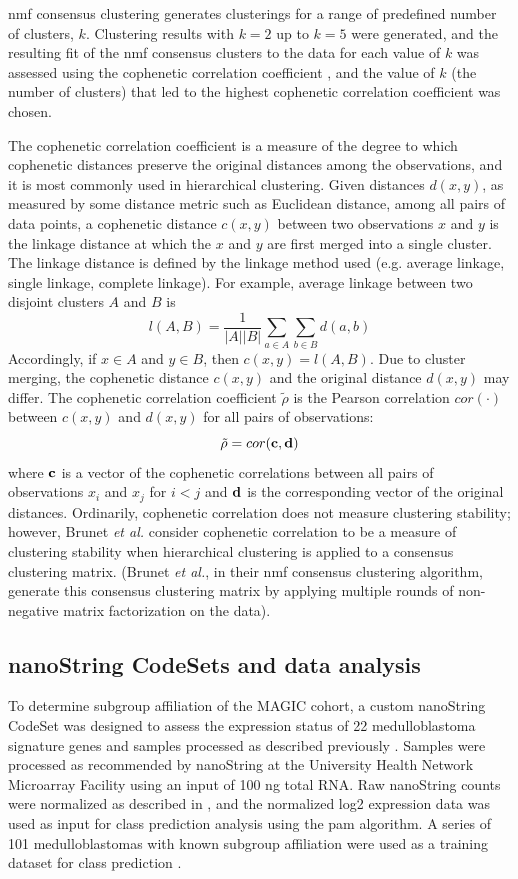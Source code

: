 \gls{nmf} consensus clustering generates clusterings for a range of predefined number of clusters, $k$. Clustering results with $k = 2$ up to $k = 5$ were generated, and the resulting fit of the \gls{nmf} consensus clusters to the data for each value of $k$ was assessed using the cophenetic correlation coefficient , and the value of $k$ (the number of clusters) that led to the highest cophenetic correlation coefficient was chosen.

The cophenetic correlation coefficient is a measure of the degree to which cophenetic distances preserve the original distances among the observations, and it is most commonly used in hierarchical clustering. Given distances $d(x, y)$, as measured by some distance metric such as Euclidean distance, among all pairs of data points, a cophenetic distance $c(x, y)$ between two observations $x$ and $y$ is the linkage distance at which the $x$ and $y$ are first merged into a single cluster. The linkage distance is defined by the linkage method used (e.g. average linkage, single linkage, complete linkage). For example, average linkage between two disjoint clusters $A$ and $B$ is
\[
l(A, B) = \frac{1}{|A| |B|} \sum_{a \in A} \sum_{b \in B} d(a, b)
\]
Accordingly, if $x \in A$ and $y \in B$, then $c(x, y) = l(A, B)$. Due to cluster merging, the cophenetic distance $c(x, y)$ and the original distance $d(x, y)$ may differ. The cophenetic correlation coefficient $\tilde{\rho}$ is the Pearson correlation $cor(\cdot)$ between $c(x, y)$ and $d(x, y)$ for all pairs of observations:
\[
\tilde{\rho} = cor(\mathbf{c}, \mathbf{d})
\]
where $\mathbf{c}$ is a vector of the cophenetic correlations between all pairs of observations $x_i$ and $x_j$ for $i < j$ and $\mathbf{d}$ is the corresponding vector of the original distances. Ordinarily, cophenetic correlation does not measure clustering stability; however, Brunet \emph{et al.} consider cophenetic correlation to be a measure of clustering stability when hierarchical clustering is applied to a consensus clustering matrix. (Brunet \emph{et al.}, in their \gls{nmf} consensus clustering algorithm, generate this consensus clustering matrix by applying multiple rounds of non-negative matrix factorization on the data).

\subsection{nanoString CodeSets and data analysis}

To determine subgroup affiliation of the MAGIC cohort, a custom nanoString CodeSet was designed to assess the expression status of 22 medulloblastoma signature genes and samples processed as described previously . Samples were processed as recommended by nanoString at the University Health Network Microarray Facility using an input of 100 ng total RNA. Raw nanoString counts were normalized as described in , and the normalized log2 expression data was used as input for class prediction analysis using the \gls{pam} algorithm. A series of 101 medulloblastomas with known subgroup affiliation were used as a training dataset for class prediction .

